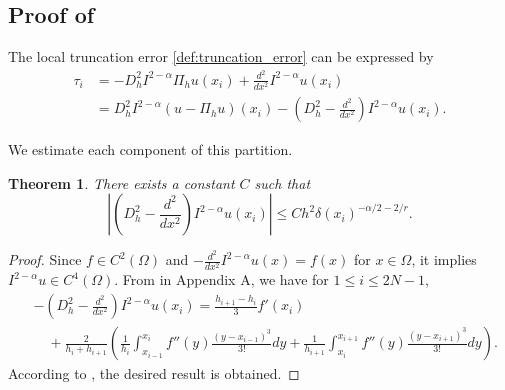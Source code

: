\documentclass{amsart}
\newtheorem{theorem}{Theorem}[section]
\theoremstyle{definition}
\theoremstyle{remark}
\numberwithin{equation}{section}
\begin{document}


\subsection{Proof of }


The local truncation error \eqref{def:truncation_error} can be expressed by
\begin{equation} \label{eq:truncerrordepart}
  \begin{aligned}
    \tau_i  &= -D_h^2 I^{2-\alpha} \Pi_h u(x_i) + \frac{d^2}{dx^2} I^{2-\alpha} u(x_i)   \\
     & = D_h^2 I^{2-\alpha} \left(u - \Pi_h u \right)(x_i) - \left( D_h^2 - \frac{d^2}{dx^2} \right) I^{2-\alpha} u(x_i)  .
  \end{aligned}
\end{equation}

We estimate each component of this partition.

  \begin{theorem} \label{lmm:trunerror2}
    There exists a constant $C$ such that
    \begin{equation}
      \left| \left(D_h^2 - \frac{d^2}{dx^2}\right) I^{2-\alpha}u (x_i) \right| 
      \le C h^2 \delta(x_i)^{-\alpha/2-2/r} .
    \end{equation}
  \end{theorem}
  \begin{proof}
    Since \(f\in C^2(\Omega)\) and
    \(
      - \frac{d^2}{dx^2} I^{2-\alpha}u(x) = f(x)
    \) for $x \in \Omega$,
    it implies \(I^{2-\alpha}u \in C^4(\Omega)\).
    From  in Appendix A,  we have for \(1\le i\le 2N-1\),
    \begin{equation*}
      \begin{aligned}
        &- \left(D_h^2 - \frac{d^2}{dx^2}\right) I^{2-\alpha}u (x_i)
         = \frac{h_{i+1}-h_{i}}{3} f'(x_i) \\
         & \quad + \frac{2}{h_i + h_{i+1}}\left(\frac{1}{h_i} \int_{x_{i-1}}^{x_{i}} f''(y) \frac{(y-x_{i-1})^3}{3!} dy + \frac{1}{h_{i+1}} \int_{x_{i}}^{x_{i+1}} f''(y) \frac{(y-x_{i+1})^3}{3!} dy\right).
      \end{aligned}
    \end{equation*}
    According to ,  the desired result is obtained.
  \end{proof}
\end{document}

